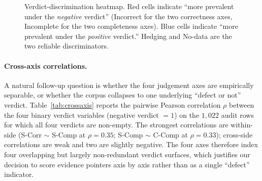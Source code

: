 \documentclass[11pt,a4paper]{article}
\begin{document}
\begin{figure}[t]
\centering
{}
\caption{Verdict-discrimination heatmap. Red cells indicate
``more prevalent under the \emph{negative} verdict'' (Incorrect for
the two correctness axes, Incomplete for the two completeness axes).
Blue cells indicate ``more prevalent under the \emph{positive}
verdict.'' Hedging and No-data are the two reliable discriminators.}
\label{fig:disc-heatmap}
\end{figure}

\paragraph{Cross-axis correlations.}\label{sec:crossaxis}
A natural follow-up question is whether the four judgement axes are
empirically separable, or whether the corpus collapses to one
underlying ``defect or not'' verdict. Table~\ref{tab:crossaxis}
reports the pairwise Pearson correlation $\rho$ between the four
binary verdict variables (negative verdict $=1$) on the $1{,}022$
audit rows for which all four verdicts are non-empty. The strongest
correlations are within-side (S-Corr $\sim$ S-Comp at $\rho=0.35$;
S-Comp $\sim$ C-Comp at $\rho=0.33$); cross-side correlations are
weak and two are slightly negative. The four axes therefore index
four overlapping but largely non-redundant verdict surfaces, which
justifies our decision to score evidence pointers axis by axis rather
than as a single ``defect'' indicator.
\end{document}
